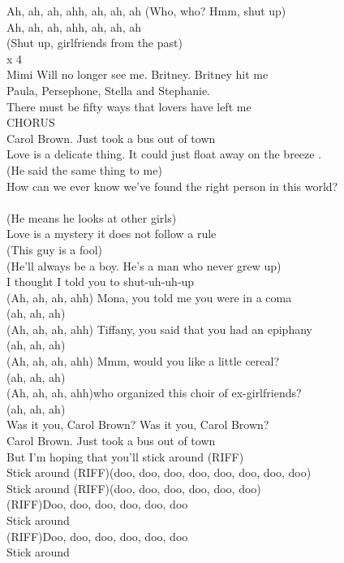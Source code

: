 Ah, ah, ah, ahh, ah, ah, ah (Who, who? Hmm, shut up)\\
Ah, ah, ah, ahh, ah, ah, ah \\
(Shut up, girlfriends from the past)\\
 x 4\\
Mimi Will no longer see me.  Britney. Britney hit me\\
Paula, Persephone, Stella and Stephanie.\\
There must be fifty ways that lovers have left me\\
CHORUS\\
Carol Brown. Just took a bus out of town\\
Love is a delicate thing. It could just float away on the breeze    .\\
 (He said the same thing to me)\\
How can we ever know we've found the right person in this world?\\
 \\
(He means he looks at other girls)\\
Love is a mystery it does not follow a rule  \\
(This guy is a fool)\\
(He'll always be a boy. He's a man who never grew up)  	\\
I thought I told you to shut-uh-uh-up\\
(Ah, ah, ah, ahh) Mona, you told me you were in a coma\\
 (ah, ah, ah)\\
(Ah, ah, ah, ahh) Tiffany, you said that you had an epiphany\\
 (ah, ah, ah)\\
(Ah, ah, ah, ahh) Mmm, would you like a little cereal?\\
(ah, ah, ah)\\
(Ah, ah, ah, ahh)who organized this choir of ex-girlfriends?\\
(ah, ah, ah) \\
Was it you, Carol Brown? Was it you, Carol Brown?\\
Carol Brown. Just took a bus out of town\\
But I'm hoping that you'll stick around (RIFF)\\
Stick around (RIFF)(doo, doo, doo, doo, doo, doo, doo, doo)\\
Stick around (RIFF)(doo, doo, doo, doo, doo, doo)\\
(RIFF)Doo, doo, doo, doo, doo, doo\\
Stick around\\
(RIFF)Doo, doo, doo, doo, doo, doo\\
Stick around

